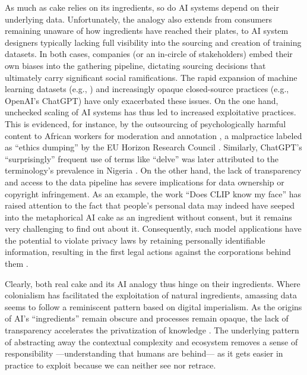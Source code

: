 \documentclass[manuscript,screen,authorversion,nonacm]{acmart}
\begin{document}
As much as cake relies on its ingredients, so do AI systems depend on their underlying data. Unfortunately, the analogy also extends from consumers remaining unaware of how ingredients have reached their plates, to AI system designers typically lacking full visibility into the sourcing and creation of training datasets. 
In both cases, companies (or an in-circle of stakeholders) embed their own biases into the gathering pipeline, dictating sourcing decisions that ultimately carry significant social ramifications.
The rapid expansion of machine learning datasets (e.g., \citet{Schuhmann2022Laion5b}) and increasingly opaque closed-source practices (e.g., OpenAI's ChatGPT) have only exacerbated these issues.
On the one hand, unchecked scaling of AI systems has thus led to increased exploitative practices. This is evidenced, for instance, by the outsourcing of psychologically harmful content to African workers for moderation and annotation \cite{Rowe2023MentalTollAIModels}, a malpractice labeled as ``ethics dumping'' by the EU Horizon Research Council \cite{EuropeanComission2015EthicsDumping,Schroeder2018EthicsDumping}.
Similarly, ChatGPT's ``surprisingly'' frequent use of terms like ``delve'' was later attributed to the terminology's prevalence in Nigeria \cite{Hern2024CheapOutsourcedAILabor}. 
On the other hand, the lack of transparency and access to the data pipeline has severe implications for data ownership or copyright infringement. As an example, the work ``Does CLIP know my face'' \cite{Hintersdorf22DoesClipKnowMyFace} has raised attention to the fact that people's personal data may indeed have seeped into the metaphorical AI cake as an ingredient without consent, but it remains very challenging to find out about it. 
Consequently, such model applications have the potential to violate privacy laws by retaining personally identifiable information, resulting in the first legal actions against the corporations behind them \cite{Noyb2024ChatGPTFalseInfo}. 

Clearly, both real cake and its AI analogy thus hinge on their ingredients. Where colonialism has facilitated the exploitation of natural ingredients, amassing data seems to follow a reminiscent pattern based on digital imperialism.
As the origins of AI’s ``ingredients'' remain obscure and processes remain opaque, the lack of transparency accelerates the privatization of knowledge \cite{Ferrari2023FoundationModKnowledgePrivatization}. The underlying pattern of abstracting away the contextual complexity and ecosystem removes a sense of responsibility ---understanding that humans are behind--- as it gets easier in practice to exploit because we can neither see nor retrace. 
\end{document}
